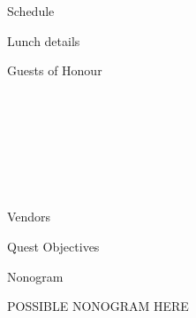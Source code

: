 \documentclass[a4paper,12pt]{article}
\newcommand{\articleAuthor}{}
\newenvironment{article}[2]{
	\pagebreak[2]
	\renewcommand{\articleAuthor}{#2}
	
	{\Huge#1}

	}{

	\notblank{\articleAuthor}{\hfill\Large\articleAuthor}{}
	\vspace{12mm}
	}
\begin{document}
\clearpage
\begin{article}{Schedule}{}
	
\end{article}

\vspace{- 2 cm}

\begin{article}{Lunch details}{}
	
\end{article}

\clearpage

\begin{article}{Guests of Honour}{}

\\ \\

\\ \\

\\ \\

\clearpage

%		
%
%		
%
%		
%
%		
%
%		
\end{article}

\clearpage

\begin{article}{Vendors}{}
	
\end{article}

\clearpage
\begin{article}{Quest Objectives}{}
	
\end{article}

\begin{article}{Nonogram}{}
	\begin{center}
POSSIBLE NONOGRAM HERE
	\end{center}
\end{article}
\end{document}
